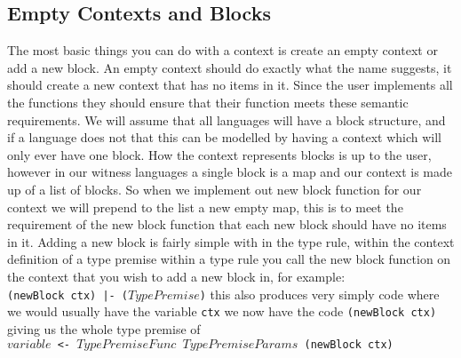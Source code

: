 \subsection{Empty Contexts and Blocks}
The most basic things you can do with a context is create an empty context or add a new block.
An empty context should do exactly what the name suggests, it should create a new context that has no items in it.
Since the user implements all the functions they should ensure that their function meets these semantic requirements.
We will assume that all languages will have a block structure, and if a language does not that this can be modelled by having a context which will only ever have one block.
How the context represents blocks is up to the user, however in our witness languages a single block is a map and our context is made up of a list of blocks.
So when we implement out new block function for our context we will prepend to the list a new empty map, this is to meet the requirement of the new block function that each new block should have no items in it.
Adding a new block is fairly simple with in the type rule, within the context definition of a type premise within a type rule you call the new block function on the context that you wish to add a new block in, for example:\\\texttt{{(newBlock ctx)} |- ($TypePremise$)}
this also produces very simply code where we would usually have the variable \texttt{ctx} we now have the code \texttt{(newBlock ctx)} giving us the whole type premise of\\\texttt{$variable$ <- $TypePremiseFunc$ $TypePremiseParams$ (newBlock ctx)}
